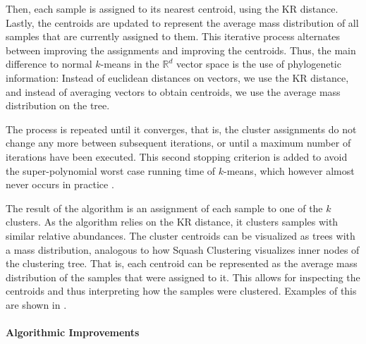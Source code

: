 Then, each sample is assigned to its nearest centroid, using the KR distance. %
Lastly, the centroids are updated to represent
the average mass distribution of all samples that are currently assigned to them.
This iterative process alternates between improving the assignments and improving the centroids.
Thus, the main difference to normal $k$-means in the $\mathbb{R}^d$ vector space is the use of phylogenetic information:
Instead of euclidean distances on vectors, we use the KR distance,
and instead of averaging vectors to obtain centroids, we use the average mass distribution on the tree.

The process is repeated until it converges,
that is, the cluster assignments do not change any more between subsequent iterations,
or until a maximum number of iterations have been executed.
This second stopping criterion is added to avoid the super-polynomial worst case running time of $k$-means,
which however almost never occurs in practice \cite{Bottou1995,Arthur2006}.

The result of the algorithm is an assignment of each sample to one of the $k$ clusters.
As the algorithm relies on the KR distance, it clusters samples with similar relative abundances.
The cluster centroids can be visualized as trees with a mass distribution,
analogous to how Squash Clustering visualizes inner nodes of the clustering tree.
That is, each centroid can be represented as the average mass distribution of the samples that were assigned to it.
This allows for inspecting the centroids and thus interpreting how the samples were clustered.
Examples of this are shown in .


\paragraph{Algorithmic Improvements}
\label{ch:Clustering:sec:Methods:sub:PhylogeneticKmeans:par:AlgorithmicImprovements}


